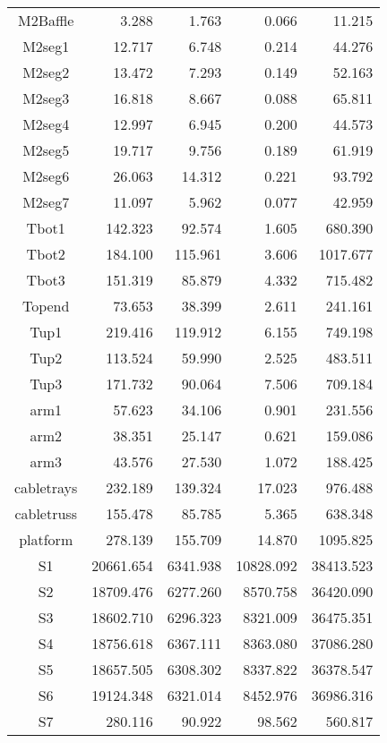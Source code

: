 \begin{longtable}{crrrr}
 M2Baffle & 3.288 & 1.763 & 0.066 & 11.215 \\
 M2seg1 & 12.717 & 6.748 & 0.214 & 44.276 \\
 M2seg2 & 13.472 & 7.293 & 0.149 & 52.163 \\
 M2seg3 & 16.818 & 8.667 & 0.088 & 65.811 \\
 M2seg4 & 12.997 & 6.945 & 0.200 & 44.573 \\
 M2seg5 & 19.717 & 9.756 & 0.189 & 61.919 \\
 M2seg6 & 26.063 & 14.312 & 0.221 & 93.792 \\
 M2seg7 & 11.097 & 5.962 & 0.077 & 42.959 \\
 Tbot1 & 142.323 & 92.574 & 1.605 & 680.390 \\
 Tbot2 & 184.100 & 115.961 & 3.606 & 1017.677 \\
 Tbot3 & 151.319 & 85.879 & 4.332 & 715.482 \\
 Topend & 73.653 & 38.399 & 2.611 & 241.161 \\
 Tup1 & 219.416 & 119.912 & 6.155 & 749.198 \\
 Tup2 & 113.524 & 59.990 & 2.525 & 483.511 \\
 Tup3 & 171.732 & 90.064 & 7.506 & 709.184 \\
 arm1 & 57.623 & 34.106 & 0.901 & 231.556 \\
 arm2 & 38.351 & 25.147 & 0.621 & 159.086 \\
 arm3 & 43.576 & 27.530 & 1.072 & 188.425 \\
 cabletrays & 232.189 & 139.324 & 17.023 & 976.488 \\
 cabletruss & 155.478 & 85.785 & 5.365 & 638.348 \\
 platform & 278.139 & 155.709 & 14.870 & 1095.825 \\
 S1 & 20661.654 & 6341.938 & 10828.092 & 38413.523 \\
 S2 & 18709.476 & 6277.260 & 8570.758 & 36420.090 \\
 S3 & 18602.710 & 6296.323 & 8321.009 & 36475.351 \\
 S4 & 18756.618 & 6367.111 & 8363.080 & 37086.280 \\
 S5 & 18657.505 & 6308.302 & 8337.822 & 36378.547 \\
 S6 & 19124.348 & 6321.014 & 8452.976 & 36986.316 \\
 S7 & 280.116 & 90.922 & 98.562 & 560.817 \\
\bottomrule
\end{longtable}




